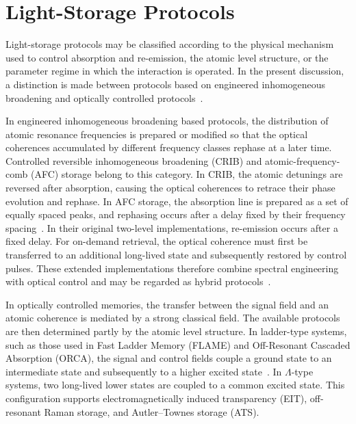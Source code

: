 \section{Light-Storage Protocols}
\label{sec:storage_protocols}

Light-storage protocols may be classified according to the physical mechanism used to control absorption and re-emission, the atomic level structure, or the parameter regime in which the interaction is operated. In the present discussion, a distinction is made between protocols based on engineered inhomogeneous broadening and optically controlled protocols~\cite{AWAVQMitCoSR_Rodriguez_}.

In engineered inhomogeneous broadening based protocols, the distribution of atomic resonance frequencies is prepared or modified so that the optical coherences accumulated by different frequency classes rephase at a later time. Controlled reversible inhomogeneous broadening (CRIB) and atomic-frequency-comb (AFC) storage belong to this category. In CRIB, the atomic detunings are reversed after absorption, causing the optical coherences to retrace their phase evolution and rephase. In AFC storage, the absorption line is prepared as a set of equally spaced peaks, and rephasing occurs after a delay fixed by their frequency spacing~\cite{Oqm_LvovskyEtAl_2009}. In their original two-level implementations, re-emission occurs after a fixed delay. For on-demand retrieval, the optical coherence must first be transferred to an additional long-lived state and subsequently restored by control pulses. These extended implementations therefore combine spectral engineering with optical control and may be regarded as hybrid protocols~\cite{AWAVQMitCoSR_Rodriguez_,Oqm_LvovskyEtAl_2009}.

In optically controlled memories, the transfer between the signal field and an atomic coherence is mediated by a strong classical field. The available protocols are then determined partly by the atomic level structure. In ladder-type systems, such as those used in Fast Ladder Memory (FLAME) and Off-Resonant Cascaded Absorption (ORCA), the signal and control fields couple a ground state to an intermediate state and subsequently to a higher excited state~\cite{ADToAEQMEBoaEQCD_RobertsonEtAl_2026, AWAVQMitCoSR_Rodriguez_}. In $\Lambda$-type systems, two long-lived lower states are coupled to a common excited state. This configuration supports electromagnetically induced transparency (EIT), off-resonant Raman storage, and Autler--Townes storage (ATS).

